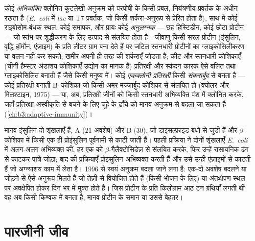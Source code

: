 \begin{definition}[अभिव्यक्ति प्रणालियाँ]\label{def:b3:genetic-engineering:expression}
कोई \emph{अभिव्यक्ति } क्लोनित कूटलेखी अनुक्रम को परपोषी के किसी
प्रबल, नियंत्रणीय प्रवर्तक के अधीन रखता है (\emph{E.~coli} में
\emph{lac} या T7 प्रवर्तक, जो किसी शर्करा-अनुरूप से प्रेरित होता है),
साथ में कोई राइबोसोम-बंधक स्थल, कोई समापक, और प्रायः कोई \emph{अनुलग्नक}
--- छह हिस्टिडीन, कोई छोटा प्रोटीन --- जो स्तंभ पर शुद्धीकरण के लिए
उत्पाद से संलयित होता है। जीवाणु किसी सरल प्रोटीन (इंसुलिन,
वृद्धि हॉर्मोन, एंज़ाइम) के प्रति लीटर ग्राम बना देते हैं पर जटिल
स्तनधारी प्रोटीनों का ग्लाइकोसिलीकरण या वलन नहीं कर सकते; खमीर अपनी ही
तरह की शर्कराएँ जोड़ता है; कीट और स्तनधारी कोशिकाएँ (चीनी हैम्स्टर
अंडाशय कोशिकाएँ उद्योग का मानक हैं) प्रतिरक्षी और स्कंदन कारक ऐसे वलित
तथा ग्लाइकोसिलित बनाती हैं जैसे किसी मनुष्य में। कोई
\emph{एकक्लोनी प्रतिरक्षी} किसी \emph{संकरार्बुद} से बनता है ---
कोई प्रतिरक्षी बनाती B~कोशिका जो किसी अमर मज्जार्बुद कोशिका से संलयित
हो (क्योलर और मिलश्टाइन, 1975) --- या, अब, प्रतिरक्षी जीनों को किसी
स्तनधारी अभिव्यक्ति वंश में क्लोनित करके, जहाँ प्रतिरक्षा-अस्वीकृति से
बचने के लिए चूहे के ढाँचे को मानव अनुक्रम से बदला जा सकता है
(\cref{ch:b3:adaptive-immunity})।
\end{definition}

\begin{example}[इंसुलिन]\label{ex:b3:genetic-engineering:insulin}
मानव इंसुलिन दो शृंखलाएँ हैं, A (21 अवशेष) और B (30), जो डाइसल्फ़ाइड
बंधों से जुड़ी हैं और $\beta$ कोशिका में किसी एक ही प्रोइंसुलिन
पूर्वगामी से काटी जाती हैं। पहली प्रक्रिया ने दोनों शृंखलाएँ
\emph{E.~coli} में अलग-अलग अभिव्यक्त कीं, हर एक को
$\beta$-गैलैक्टोसिडेज़ से संलयित करके, फिर उन्हें रासायनिक ढंग से
काटकर पात्रे जोड़ा; बाद की प्रक्रियाएँ प्रोइंसुलिन अभिव्यक्त करती हैं
और उसे उन्हीं एंज़ाइमों से काटती हैं जो अग्न्याशय काम में लेता है। 1996
से स्वयं अनुक्रम बदला जाने लगा है: एक-दो अवशेष बदलने या जोड़ने से ऐसे
अनुरूप मिलते हैं जो तेज़ी से वियोजित होते हैं (किसी भोजन के लिए) या
अंतःक्षेपण-स्थल पर अवक्षेपित होकर दिन भर में मुक्त होते हैं। जिस
प्रोटीन के प्रति किलोग्राम आठ टन ग्रंथियाँ लगती थीं वह अब किसी किण्वक
में बनता है, मानव प्रोटीन के समान या उससे बेहतर।
\end{example}

\section{पारजीनी जीव}

